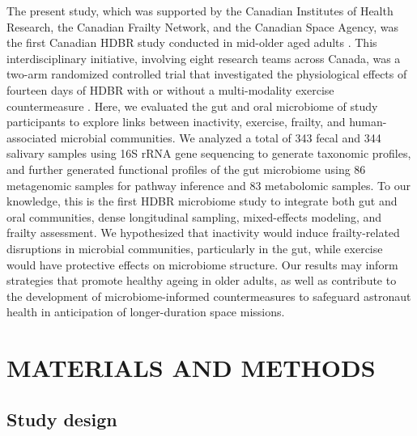 \documentclass[preprint,12pt,authoryear]{elsarticle}
\begin{document}
   The present study, which was supported by the Canadian Institutes of Health Research, the Canadian Frailty Network, and the Canadian Space Agency, was the first Canadian HDBR study conducted in mid-older aged adults \citep{hajj-boutrosMythsMethodologiesUnderstanding2024}. This interdisciplinary initiative, involving eight research teams across Canada, was a two-arm randomized controlled trial that investigated the physiological effects of fourteen days of HDBR with or without a multi-modality exercise countermeasure \citep{hedgeImplementationExerciseCountermeasures2022}. Here, we evaluated the gut and oral microbiome of study participants to explore links between inactivity, exercise, frailty, and human-associated microbial communities. We analyzed a total of 343 fecal and 344 salivary samples using 16S rRNA gene sequencing to generate taxonomic profiles, and further generated functional profiles of the gut microbiome using 86 metagenomic samples for pathway inference and 83 metabolomic samples. To our knowledge, this is the first HDBR microbiome study to integrate both gut and oral communities, dense longitudinal sampling, mixed-effects modeling, and frailty assessment. We hypothesized that inactivity would induce frailty-related disruptions in microbial communities, particularly in the gut, while exercise would have protective effects on microbiome structure. Our results may inform strategies that promote healthy ageing in older adults, as well as contribute to the development of microbiome-informed countermeasures to safeguard astronaut health in anticipation of longer-duration space missions.

\section{MATERIALS AND METHODS}

\subsection{Study design}
\end{document}
